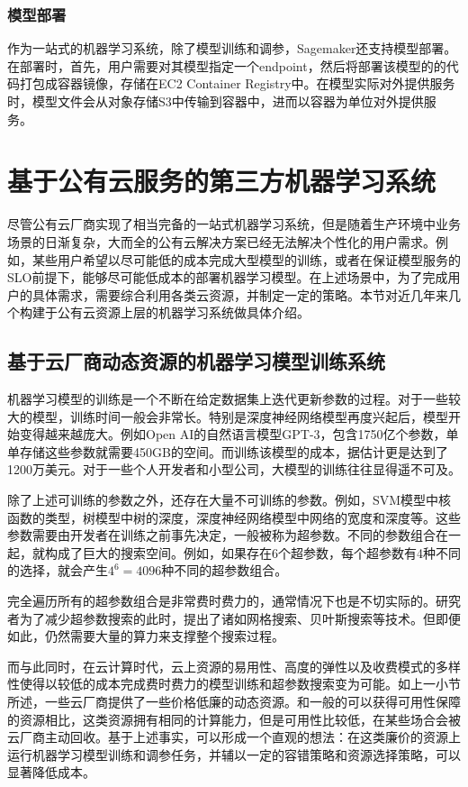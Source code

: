 \subsubsection{模型部署}
作为一站式的机器学习系统，除了模型训练和调参，Sagemaker还支持模型部署。在部署时，首先，用户需要对其模型指定一个endpoint，然后将部署该模型的的代码打包成容器镜像，存储在EC2 Container Registry中。在模型实际对外提供服务时，模型文件会从对象存储S3中传输到容器中，进而以容器为单位对外提供服务。

\section{基于公有云服务的第三方机器学习系统}
尽管公有云厂商实现了相当完备的一站式机器学习系统，但是随着生产环境中业务场景的日渐复杂，大而全的公有云解决方案已经无法解决个性化的用户需求。例如，某些用户希望以尽可能低的成本完成大型模型的训练，或者在保证模型服务的SLO前提下，能够尽可能低成本的部署机器学习模型。在上述场景中，为了完成用户的具体需求，需要综合利用各类云资源，并制定一定的策略。本节对近几年来几个构建于公有云资源上层的机器学习系统做具体介绍。
\subsection{基于云厂商动态资源的机器学习模型训练系统}
机器学习模型的训练是一个不断在给定数据集上迭代更新参数的过程。对于一些较大的模型，训练时间一般会非常长。特别是深度神经网络模型再度兴起后，模型开始变得越来越庞大。例如Open AI的自然语言模型GPT-3，包含1750亿个参数，单单存储这些参数就需要450GB的空间。而训练该模型的成本，据估计更是达到了1200万美元。对于一些个人开发者和小型公司，大模型的训练往往显得遥不可及。

除了上述可训练的参数之外，还存在大量不可训练的参数。例如，SVM模型中核函数的类型，树模型中树的深度，深度神经网络模型中网络的宽度和深度等。这些参数需要由开发者在训练之前事先决定，一般被称为超参数。不同的参数组合在一起，就构成了巨大的搜索空间。例如，如果存在6个超参数，每个超参数有4种不同的选择，就会产生$4^6=4096$种不同的超参数组合。

完全遍历所有的超参数组合是非常费时费力的，通常情况下也是不切实际的。研究者为了减少超参数搜索的此时，提出了诸如网格搜索、贝叶斯搜索等技术。但即便如此，仍然需要大量的算力来支撑整个搜索过程。

而与此同时，在云计算时代，云上资源的易用性、高度的弹性以及收费模式的多样性使得以较低的成本完成费时费力的模型训练和超参数搜索变为可能。如上一小节所述，一些云厂商提供了一些价格低廉的动态资源。和一般的可以获得可用性保障的资源相比，这类资源拥有相同的计算能力，但是可用性比较低，在某些场合会被云厂商主动回收。基于上述事实，可以形成一个直观的想法：在这类廉价的资源上运行机器学习模型训练和调参任务，并辅以一定的容错策略和资源选择策略，可以显著降低成本。

